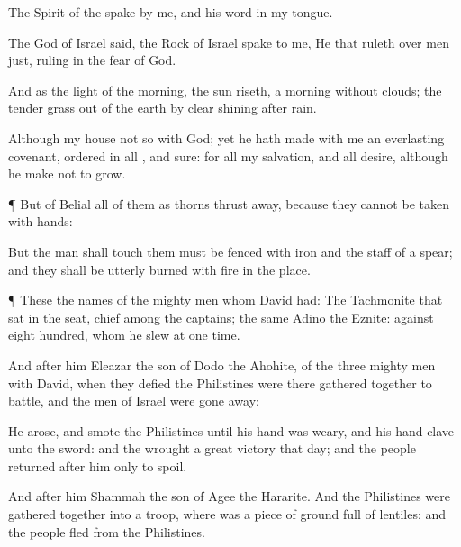 {The
Spirit of the
{}
spake by me, and his
word
{} in my
tongue.

The
God of
Israel
said, the
Rock of
Israel
spake to me, He that
ruleth over
men
{}
just,
ruling in the
fear of
God.

And
{} as the
light of the
morning,
{} the
sun
riseth,
{} a
morning
without
clouds;
{} the tender
grass
{} out of the
earth by clear
shining after
rain.

Although my
house
{} not so with
God; yet he hath
made with me an
everlasting
covenant,
ordered in all
{}, and
sure: for
{} all my
salvation, and all
{}
desire, although he make
{} not to
grow.


\par }{\PP {}¶ But
{} of
Belial
{} all of them as
thorns thrust
away, because they cannot be
taken with
hands:

But the
man
{} shall
touch them must be
fenced with
iron and the
staff of a
spear; and they shall be
utterly
burned with
fire in the
{}
place.


\par }{\PP {}¶ These
{} the
names of the mighty
men whom
David had: The
Tachmonite that
sat in the
seat,
chief among the
captains; the same
{}
Adino the
Eznite:
{} against
eight
hundred, whom he
slew at
one
time.

And
after him
{}
Eleazar the
son of
Dodo the
Ahohite,
{} of the
three mighty
men with
David, when they
defied the
Philistines
{} were there gathered
together to
battle, and the
men of
Israel were gone
away:

He
arose, and
smote the
Philistines
until his
hand was
weary, and his
hand
clave unto the
sword: and the
{}
wrought a
great
victory that
day; and the
people
returned
after him only to
spoil.

And
after him
{}
Shammah the
son of
Agee the
Hararite. And the
Philistines were gathered
together into a
troop, where was a
piece of
ground
full of
lentiles: and the
people
fled
from the
Philistines.

}
